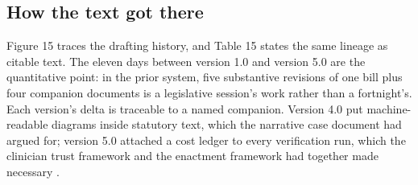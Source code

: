 \subsection{How the text got there}

Figure 15 traces the drafting history, and Table 15 states the same lineage as
citable text. The eleven days between version 1.0 and version 5.0 are the
quantitative point: in the prior system, five substantive revisions of one bill
plus four companion documents is a legislative session's work rather than a
fortnight's. Each version's delta is traceable to a named companion. Version 4.0
put machine-readable diagrams inside statutory text, which the narrative case
document had argued for; version 5.0 attached a cost ledger to every
verification run, which the clinician trust framework and the enactment
framework had together made necessary
\cite{narrativecase2026, clintrust, congressvote}.

